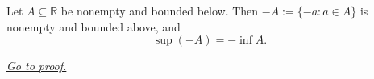 \begin{theorem}
\label{thm:negation-exchange-sup-inf}
Let $A\subseteq\mathbb{R}$ be nonempty and bounded below.  Then
$-A:=\{-a:a\in A\}$ is nonempty and bounded above, and
\[
  \sup(-A)=-\inf A.
\]

\smallskip
\noindent
\hyperref[prf:negation-exchange-sup-inf]{\textit{Go to proof.}}
\end{theorem}